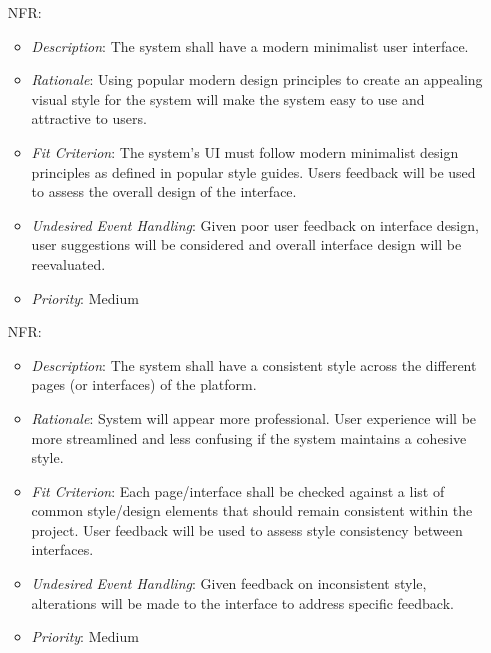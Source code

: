 \documentclass[12pt]{article}
\newcounter{nfrnum} %
\begin{document}
\noindent \begin{itemize}

\item[NFR\refstepcounter{nfrnum}\thenfrnum \label{NFR_1}:] 
\begin{itemize}
  \item \textit{Description}: The system shall have a modern minimalist user interface.
  \item \textit{Rationale}: Using popular modern design principles to create an appealing visual style for the system will make the system easy to use and attractive to users.
  \item \textit{Fit Criterion}: The system’s UI must follow modern minimalist design principles as defined in popular style guides. Users feedback will be used to assess the overall design of the interface. 
  \item \textit{Undesired Event Handling}: Given poor user feedback on interface design, user suggestions will be considered and overall interface design will be reevaluated. 
  \item \textit{Priority}: Medium
\end{itemize}


\item[NFR\refstepcounter{nfrnum}\thenfrnum \label{NFR_2}:] 
\begin{itemize}
  \item \textit{Description}: The system shall have a consistent style across the different pages (or interfaces) of the platform. 
  \item \textit{Rationale}: System will appear more professional. User experience will be more streamlined and less confusing if the system maintains a cohesive style. 
  \item \textit{Fit Criterion}: Each page/interface shall be checked against a list of common style/design elements that should remain consistent within the project. User feedback will be used to assess style consistency between interfaces. 
  \item \textit{Undesired Event Handling}: Given feedback on inconsistent style, alterations will be made to the interface to address specific feedback. 
  \item \textit{Priority}: Medium
\end{itemize}


\end{itemize}
\end{document}
